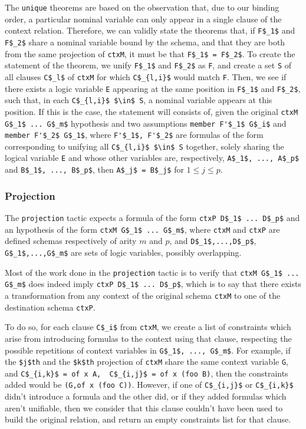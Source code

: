 \documentclass[nocopyrightspace,authoryear]{sigplanconf}
\begin{document}
The \lstinline|unique| theorems are based on the observation that, due to our binding order, a particular nominal variable can only appear in a single clause of the context relation. Therefore, we can validly state the theorems that, if \lstinline|F$_1$| and \lstinline|F$_2$| share a nominal variable bound by the schema, and that they are both from the same projection of \lstinline|ctxM|, it must be that \lstinline|F$_1$ = F$_2$|. To create the statement of the theorem, we unify \lstinline|F$_1$| and \lstinline|F$_2$| as \lstinline|F|, and create a set \lstinline|S| of all clauses \lstinline|C$_l$| of \lstinline|ctxM| for which \lstinline|C$_{l,i}$| would match \lstinline|F|. Then, we see if there exists a logic variable \lstinline|E| appearing at the same position in \lstinline|F$_1$| and \lstinline|F$_2$|, such that, in each \lstinline|C$_{l,i}$ $\in$ S|, a nominal variable appears at this position. If this is the case, the statement will consists of, given the original \lstinline|ctxM G$_1$ ... G$_m$| hypothesis and two assumptions \lstinline|member F'$_1$ G$_i$| and \lstinline|member F'$_2$ G$_1$|, where \lstinline|F'$_1$, F'$_2$| are formulas of the form corresponding to unifying all \lstinline|C$_{l,i}$ $\in$ S| together, solely sharing the logical variable \lstinline|E| and whose other variables are, respectively, \lstinline|A$_1$, ..., A$_p$| and \lstinline|B$_1$, ..., B$_p$|, then \lstinline|A$_j$ = B$_j$| for $1 \leq j \leq p$.



\subsubsection{Projection}
The \lstinline|projection| tactic expects a formula of the form \lstinline|ctxP D$_1$ ... D$_p$| and an hypothesis of the form \lstinline|ctxM G$_1$ ... G$_m$|, where \lstinline|ctxM| and \lstinline|ctxP| are defined schemas respectively of arity $m$ and $p$, and \lstinline|D$_1$,...,D$_p$|, \lstinline|G$_1$,...,G$_m$| are sets of logic variables, possibly overlapping.

Most of the work done in the \lstinline|projection| tactic is to verify that \lstinline|ctxM G$_1$ ... G$_m$| does indeed imply \lstinline|ctxP D$_1$ ... D$_p$|, which is to say that there exists a transformation from any context of the original schema \lstinline|ctxM| to one of the destination schema \lstinline|ctxP|.

To do so, for each clause \lstinline|C$_i$| from \lstinline|ctxM|, we create a list of constraints which arise from introducing formulas to the context using that clause, respecting the possible repetitions of context variables in \lstinline|G$_1$, ..., G$_m$|. For example, if the \lstinline|$j$th| and the \lstinline|$k$th| projection of \lstinline|ctxM| share the same context variable \lstinline|G|, and \lstinline|C$_{i,k}$ = of x A,  C$_{i,j}$ = of x (foo B)|, then the constraints added would be \lstinline|(G,of x (foo C))|. However, if one of \lstinline|C$_{i,j}$| or \lstinline|C$_{i,k}$| didn't introduce a formula and the other did, or if they added formulas which aren't unifiable, then we consider that this clause couldn't have been used to build the original relation, and return an empty constraints list for that clause.
\end{document}
